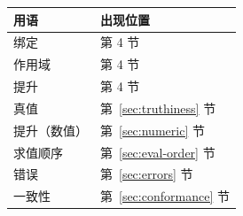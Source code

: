 \documentclass[UTF8,12pt]{ctexart}
\begin{document}
\begin{center}
\begin{longtable}{@{}ll@{}}
\toprule
用语 & 出现位置 \\
\midrule
绑定 & 第 4 节 \\
作用域 & 第 4 节 \\
提升 & 第 4 节 \\
真值 & 第~\ref{sec:truthiness} 节 \\
提升（数值） & 第~\ref{sec:numeric} 节 \\
求值顺序 & 第~\ref{sec:eval-order} 节 \\
错误 & 第~\ref{sec:errors} 节 \\
一致性 & 第~\ref{sec:conformance} 节 \\
\bottomrule
\end{longtable}
\end{center}
\end{document}
